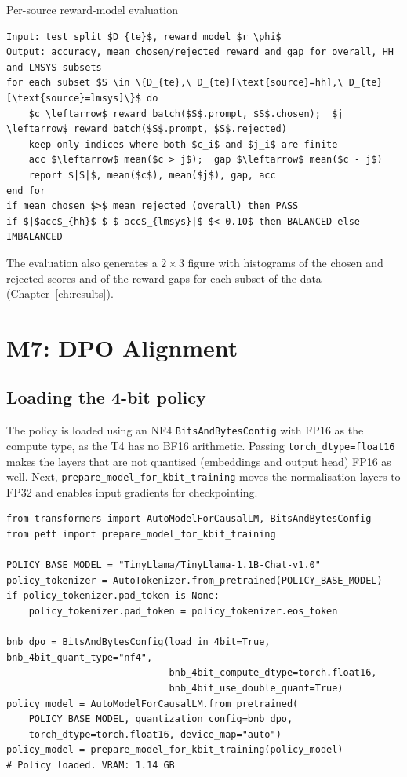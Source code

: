 \begin{algobox}{Per-source reward-model evaluation}\label{alg:rmeval}
\begin{lstlisting}[style=algo]
Input: test split $D_{te}$, reward model $r_\phi$
Output: accuracy, mean chosen/rejected reward and gap for overall, HH and LMSYS subsets
for each subset $S \in \{D_{te},\ D_{te}[\text{source}=hh],\ D_{te}[\text{source}=lmsys]\}$ do
    $c \leftarrow$ reward_batch($S$.prompt, $S$.chosen);  $j \leftarrow$ reward_batch($S$.prompt, $S$.rejected)
    keep only indices where both $c_i$ and $j_i$ are finite
    acc $\leftarrow$ mean($c > j$);  gap $\leftarrow$ mean($c - j$)
    report $|S|$, mean($c$), mean($j$), gap, acc
end for
if mean chosen $>$ mean rejected (overall) then PASS
if $|$acc$_{hh}$ $-$ acc$_{lmsys}|$ $< 0.10$ then BALANCED else IMBALANCED
\end{lstlisting}
\end{algobox}

The evaluation also generates a $2\times3$ figure with histograms of the chosen and rejected scores and of the reward gaps for each subset of the data (Chapter~\ref{ch:results}).

\section{M7: DPO Alignment}
\label{sec:m7}

\subsection{Loading the 4-bit policy}
The policy is loaded using an NF4 \texttt{BitsAndBytesConfig} with FP16 as the compute type, as the T4 has no BF16 arithmetic. Passing \texttt{torch\_dtype=float16} makes the layers that are not quantised (embeddings and output head) FP16 as well. Next, \texttt{prepare\_model\_for\_kbit\_training} moves the normalisation layers to FP32 and enables input gradients for checkpointing.

\begin{lstlisting}[caption={Loading TinyLlama-1.1B-Chat in 4-bit NF4.}, label={lst:policy}]
from transformers import AutoModelForCausalLM, BitsAndBytesConfig
from peft import prepare_model_for_kbit_training

POLICY_BASE_MODEL = "TinyLlama/TinyLlama-1.1B-Chat-v1.0"
policy_tokenizer = AutoTokenizer.from_pretrained(POLICY_BASE_MODEL)
if policy_tokenizer.pad_token is None:
    policy_tokenizer.pad_token = policy_tokenizer.eos_token

bnb_dpo = BitsAndBytesConfig(load_in_4bit=True, bnb_4bit_quant_type="nf4",
                             bnb_4bit_compute_dtype=torch.float16,
                             bnb_4bit_use_double_quant=True)
policy_model = AutoModelForCausalLM.from_pretrained(
    POLICY_BASE_MODEL, quantization_config=bnb_dpo,
    torch_dtype=torch.float16, device_map="auto")
policy_model = prepare_model_for_kbit_training(policy_model)
# Policy loaded. VRAM: 1.14 GB
\end{lstlisting}


